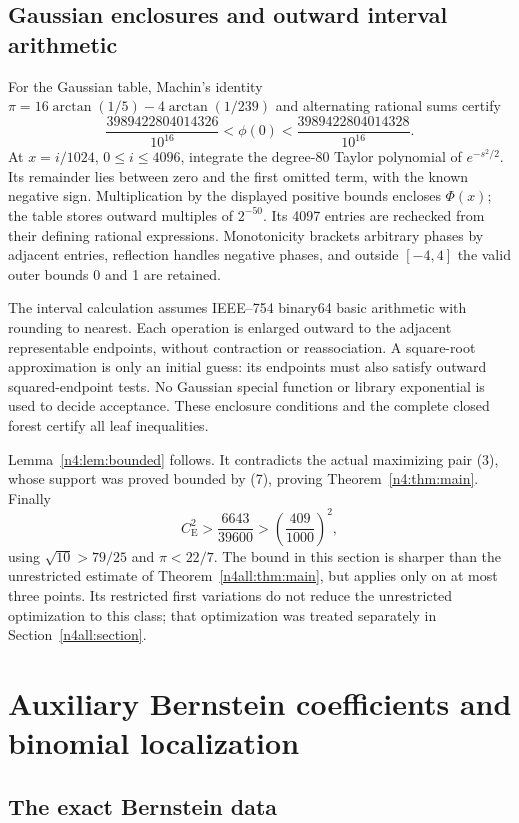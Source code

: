 \documentclass[11pt,a4paper]{article}
\numberwithin{equation}{section}
\theoremstyle{definition}
\theoremstyle{remark}
\newcommand{\CE}{C_{\mathrm E}}
\begin{document}
\subsection{Gaussian enclosures and outward interval arithmetic}
For the Gaussian table, Machin's identity
$\pi=16\arctan(1/5)-4\arctan(1/239)$ and alternating rational sums
certify
\[
 \frac{3989422804014326}{10^{16}}<\phi(0)
                   <\frac{3989422804014328}{10^{16}}.
\]
At $x=i/1024$, $0\le i\le4096$, integrate the degree-80 Taylor polynomial
of $e^{-s^2/2}$. Its remainder lies between zero and the first omitted
term, with the known negative sign. Multiplication by the displayed
positive bounds encloses $\Phi(x)$; the table stores outward multiples
of $2^{-50}$. Its 4097 entries are rechecked from their defining rational
expressions. Monotonicity brackets arbitrary phases by adjacent entries,
reflection handles negative phases, and outside $[-4,4]$ the valid
outer bounds 0 and 1 are retained.

The interval calculation assumes IEEE--754 binary64 basic arithmetic
with rounding to nearest. Each operation is enlarged outward to the
adjacent representable endpoints, without contraction or reassociation.
A square-root approximation is only an initial guess: its endpoints
must also satisfy outward squared-endpoint tests. No Gaussian special
function or library exponential is used to decide acceptance.
These enclosure conditions and the complete closed forest certify all
leaf inequalities.

Lemma~\ref{n4:lem:bounded} follows. It contradicts the actual maximizing
pair (3), whose support was proved bounded by (7), proving
Theorem~\ref{n4:thm:main}. Finally
\[
 \CE^2>\frac{6643}{39600}>\left(\frac{409}{1000}\right)^2,
\]
using $\sqrt{10}>79/25$ and $\pi<22/7$.
The bound in this section is sharper than the unrestricted estimate
of Theorem~\ref{n4all:thm:main}, but applies only on at most three
points. Its restricted first variations do not reduce the unrestricted
optimization to this class; that optimization was treated separately
in Section~\ref{n4all:section}.

\clearpage
\appendix
\section{Auxiliary Bernstein coefficients and binomial localization}\subsection{The exact Bernstein data}\label{orig:app:bernstein}
\end{document}

